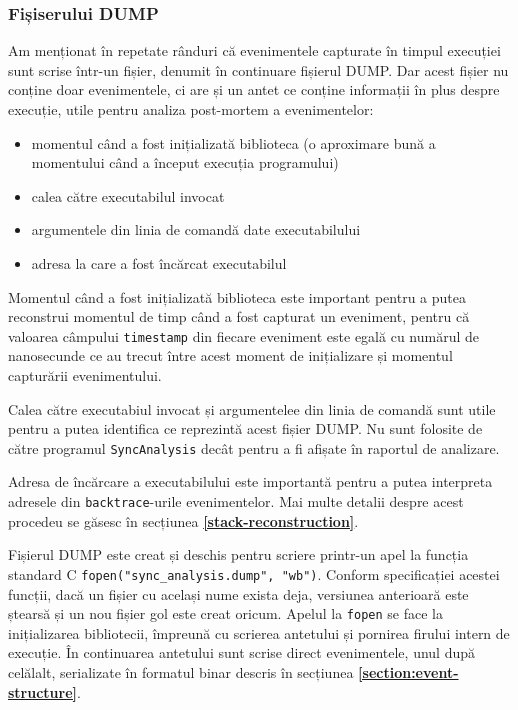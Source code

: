 \subsubsection{Fișiserului DUMP}\label{dump-file}

Am menționat în repetate rânduri că evenimentele capturate în timpul
execuției sunt scrise într-un fișier, denumit în continuare fișierul
DUMP. Dar acest fișier nu conține doar evenimentele, ci are și un antet
ce conține informații în plus despre execuție, utile pentru analiza
post-mortem a evenimentelor:
\begin{itemize}
    \item momentul când a fost inițializată biblioteca (o aproximare
    bună a momentului când a început execuția programului)
    \item calea către executabilul invocat
    \item argumentele din linia de comandă date executabilului
    \item adresa la care a fost încărcat executabilul
\end{itemize}

Momentul când a fost inițializată biblioteca este important pentru a
putea reconstrui momentul de timp când a fost capturat un eveniment,
pentru că valoarea câmpului \lstinline{timestamp} din fiecare eveniment
este egală cu numărul de nanosecunde ce au trecut între acest moment de
inițializare și momentul capturării evenimentului.

Calea către executabiul invocat și argumentelee din linia de comandă
sunt utile pentru a putea identifica ce reprezintă acest fișier DUMP. Nu
sunt folosite de către programul \lstinline{SyncAnalysis} decât pentru a
fi afișate în raportul de analizare.

Adresa de încărcare a executabilului este importantă pentru a putea
interpreta adresele din \lstinline{backtrace}-urile evenimentelor. Mai
multe detalii despre acest procedeu se găsesc în secțiunea 
\textbf{\ref{stack-reconstruction}}.

Fișierul DUMP este creat și deschis pentru scriere printr-un apel la
funcția standard C \lstinline{fopen("sync_analysis.dump", "wb")}.
Conform specificației acestei funcții, dacă un fișier cu același nume
exista deja, versiunea anterioară este ștearsă și un nou fișier gol este
creat oricum. Apelul la \lstinline{fopen} se face la inițializarea
bibliotecii, împreună cu scrierea antetului și pornirea firului intern
de execuție. În continuarea antetului sunt scrise direct evenimentele,
unul după celălalt, serializate în formatul binar descris în secțiunea
\textbf{\ref{section:event-structure}}.

